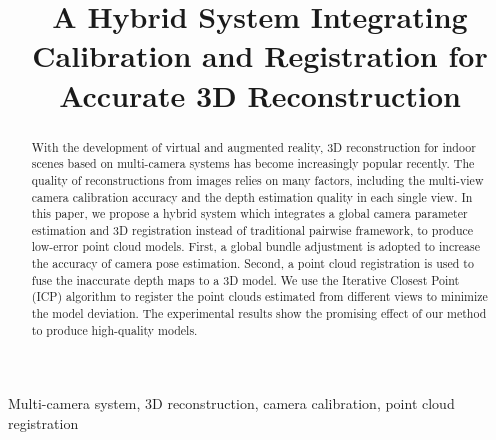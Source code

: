 \documentclass{article}
\begin{document}
\sloppy

\def\x{{\mathbf x}}
\def\L{{\cal L}}


\title{A Hybrid System Integrating Calibration and Registration for Accurate 3D Reconstruction}
%
\address{ }


\maketitle


%
\begin{abstract}
With the development of virtual and augmented reality, 3D reconstruction for indoor scenes based on multi-camera systems has become increasingly popular recently. 
%
The quality of reconstructions from images relies on many factors, including the multi-view camera calibration accuracy and the depth estimation quality in each single view. 
%
In this paper, we propose a hybrid system which integrates a global camera parameter estimation and 3D registration instead of traditional pairwise framework, to produce low-error point cloud models.
%
First, a global bundle adjustment is adopted to increase the accuracy of camera pose estimation. 
Second, a point cloud registration is used to fuse the inaccurate depth maps to a 3D model. 
We use the Iterative Closest Point (ICP) algorithm to register the point clouds estimated from different views to minimize the model deviation. 
The experimental results show the promising effect of our method to produce high-quality models.
\end{abstract}
%
\begin{keywords}
Multi-camera system, 3D reconstruction, camera calibration, point cloud registration
\end{keywords}
%









\end{document}
